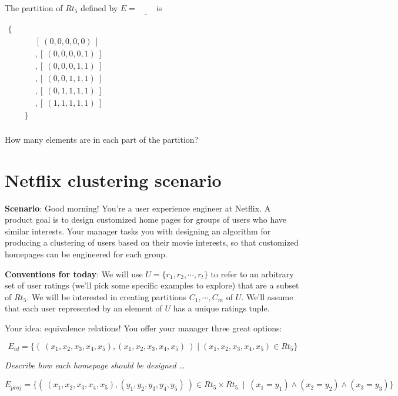 \documentclass[12pt, oneside]{article}
\begin{document}
The partition of $Rt_5$ defined by $E = \underline{\phantom{E_{circ}}}$ is

\begin{math}
\begin{aligned}
    \{ ~~  & \\
    &[ ~(0,0,0,0,0)~ ]   \\
    &, [ ~(0,0,0,0,1)~ ] \\
    &, [ ~(0,0,0,1,1)~ ] \\
    &, [ ~(0,0,1,1,1)~ ] \\
    &, [ ~(0,1,1,1,1)~ ] \\
    &, [ ~(1,1,1,1,1)~ ] \\
    \qquad\}  & \\
\end{aligned}
\end{math}

How many elements are in each part of the partition? \vfill
\section*{Netflix clustering scenario}


{\bf Scenario}: Good morning! You're a user experience engineer at Netflix. A
product goal is to design customized home pages for groups of users who have
similar interests. Your manager tasks you with designing an algorithm for
producing a clustering of users based on their movie interests,
so that customized homepages can be engineered for each group.

{\bf Conventions for today}: 
We will use $U = \{r_1, r_2, \cdots, r_t\}$ to 
refer to an arbitrary set of user ratings (we'll pick some 
specific examples to explore) that are a subset of $Rt_5$. 
We will be interested in creating partitions $C_1, \cdots, C_m$ of 
$U$. We'll assume that each user represented by an element of $U$ 
has a unique ratings tuple.


Your idea: equivalence relations! You offer your manager three great options: 

\[
    E_{id} = \{ ( ~(x_1, x_2, x_3, x_4, x_5), (x_1, x_2, x_3, x_4, x_5)~) \mid 
    (x_1, x_2, x_3, x_4, x_5) \in Rt_5  \}
\]

{\it Describe how each homepage should be designed \ldots }

\vspace{100pt}



\[
    E_{proj} =  \{ ( ~(x_1, x_2, x_3, x_4, x_5), (y_1, y_2, y_3, y_4, y_5)~) \in
         Rt_5 \times Rt_5 ~\mid~(x_1 = y_1) \land  (x_2 = y_2) \land (x_3 = y_3) \}
\]
\end{document}
